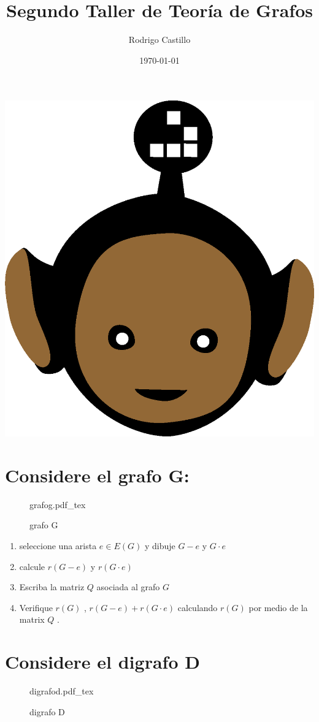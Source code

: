 \documentclass[10pt,a4paper]{article} %
\newcommand{\incfig}[1]{%
    \def\svgwidth{\columnwidth}
    {#1.pdf_tex}
}
\begin{document}
    \title{{  Segundo Taller de Teoría de Grafos  }}
    \author{{Rodrigo Castillo}}
    \date{\today}

    \maketitle


    \includegraphics[width=0.1\linewidth]{negro_cara.png}
    \section{Considere el grafo G:}
        \begin{figure}[ht]
            \centering
            \incfig{grafog}
            \caption{grafo G}
            \label{fig:grafog}
        \end{figure}


        \begin{enumerate}
            \item {seleccione una arista   $ e \in E(G)  $ y dibuje $ G -e  $ y $ G
            \cdot e  $}
        \item {calcule $ r(G-e)  $  y $ r(G \cdot e)  $ }
        \item {Escriba la matriz $Q$ asociada al grafo $G$   }
        \item {Verifique $r(G)$ ,  $r(G-e) + r(G \cdot e)$ calculando $r(G)$
            por medio de la matrix $Q$ }.
        \end{enumerate}




    \newpage
    \section{Considere el digrafo D}
        \begin{figure}[ht]
            \centering
            \incfig{digrafod}
            \caption{digrafo D}
            \label{fig:digrafod}
        \end{figure}
\end{document}
